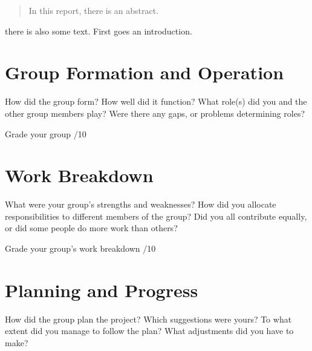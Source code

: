 \documentclass[journal]{IEEEtran}
\begin{document}
\maketitle


\begin{abstract}

In this report, there is an abstract.

\end{abstract}



 there is also some text. First goes an introduction.


\section{Group Formation and Operation}
\label{sec:formation}

How did the group form?  How well did it function?  What role(s) did you and the other group members play?  Were there any gaps, or problems determining roles?

Grade your group /10



\section{Work Breakdown}
\label{sec:work_breakdown}

What were your group’s strengths and weaknesses?  How did you allocate responsibilities to different members of the group?  Did you all contribute equally, or did some people do more work than others?

Grade your group’s work breakdown /10




\section{Planning and Progress}
\label{sec:planning}

How did the group plan the project?  Which suggestions were yours?  To what extent did you manage to follow the plan?  What adjustments did you have to make?
\end{document}
